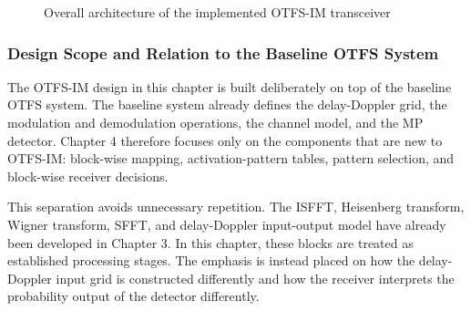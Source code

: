 \begin{figure}[H]
{
    }
    \caption{Overall architecture of the implemented OTFS-IM transceiver}
    \label{fig:otfs_im_transceiver_architecture}
\end{figure}

\subsubsection{Design Scope and Relation to the Baseline OTFS System}

The OTFS-IM design in this chapter is built deliberately on top of the baseline OTFS system. The baseline system already defines the delay-Doppler grid, the modulation and demodulation operations, the channel model, and the MP detector. Chapter 4 therefore focuses only on the components that are new to OTFS-IM: block-wise mapping, activation-pattern tables, pattern selection, and block-wise receiver decisions.

This separation avoids unnecessary repetition. The ISFFT, Heisenberg transform, Wigner transform, SFFT, and delay-Doppler input-output model have already been developed in Chapter 3. In this chapter, these blocks are treated as established processing stages. The emphasis is instead placed on how the delay-Doppler input grid is constructed differently and how the receiver interprets the probability output of the detector differently.


